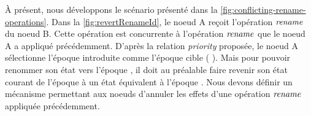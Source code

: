\label{sec:reverting-rename-ops}

À présent, nous développons le scénario présenté dans la \autoref{fig:conflicting-rename-operations}.
Dans la \autoref{fig:revertRenameId}, le noeud A reçoit l'opération $\mathit{rename}$ du noeud B.
Cette opération est concurrente à l'opération $\mathit{rename}$ que le noeud A a appliqué précédemment.
D'après la relation \emph{priority} proposée, le noeud A sélectionne l'époque introduite  comme l'époque cible ( \lepoch {}).
Mais pour pouvoir renommer son état vers l'époque , il doit au préalable faire revenir son état courant de l'époque  à un état équivalent à l'époque .
Nous devons définir un mécanisme permettant aux noeuds d'annuler les effets d'une opération $\mathit{rename}$ appliquée précédemment.

